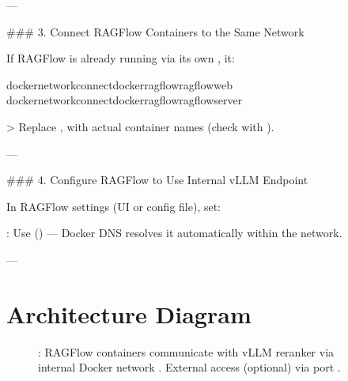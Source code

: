 \documentclass[letterpaper,10pt,english]{sphinxmanual}
\begin{document}
\sphinxAtStartPar
—

\sphinxAtStartPar
\#\#\# 3. Connect RAGFlow Containers to the Same Network

\sphinxAtStartPar
If RAGFlow is already running via its own ,  it:

\begin{sphinxVerbatim}[commandchars=\\\{\}]
dockernetworkconnectdocker\PYGZhy{}ragflowragflow\PYGZhy{}web
dockernetworkconnectdocker\PYGZhy{}ragflowragflow\PYGZhy{}server
\end{sphinxVerbatim}

\sphinxAtStartPar
\textgreater{} Replace ,  with actual container names (check with ).

\sphinxAtStartPar
—

\sphinxAtStartPar
\#\#\# 4. Configure RAGFlow to Use Internal vLLM Endpoint

\sphinxAtStartPar
In RAGFlow settings (UI or config file), set:

\begin{sphinxVerbatim}[commandchars=\\\{\}]
\end{sphinxVerbatim}

\sphinxAtStartPar
{}: Use  () — Docker DNS resolves it automatically within the network.

\sphinxAtStartPar
—


\section{Architecture Diagram}
\label{\detokenize{vllm-network:architecture-diagram}}
\begin{figure}[htbp]
\centering
\capstart

\noindent{}
\caption{: RAGFlow containers communicate with vLLM reranker via internal Docker network . External access (optional) via port .}\label{\detokenize{vllm-network:id2}}\end{figure}
\end{document}
